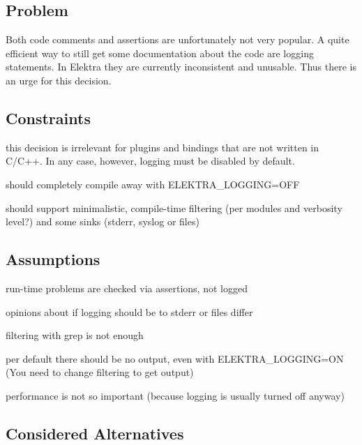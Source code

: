 \subsection*{Problem}

Both code comments and assertions are unfortunately not very popular. A quite efficient way to still get some documentation about the code are logging statements. In Elektra they are currently inconsistent and unusable. Thus there is an urge for this decision.

\subsection*{Constraints}


\begin{DoxyItemize}
\item this decision is irrelevant for plugins and bindings that are not written in C/\+C++. In any case, however, logging must be disabled by default.
\item should completely compile away with E\+L\+E\+K\+T\+R\+A\+\_\+\+L\+O\+G\+G\+I\+NG=O\+FF
\item should support minimalistic, compile-\/time filtering (per modules and verbosity level?) and some sinks (stderr, syslog or files)
\end{DoxyItemize}

\subsection*{Assumptions}


\begin{DoxyItemize}
\item run-\/time problems are checked via assertions, not logged
\item opinions about if logging should be to stderr or files differ
\item filtering with grep is not enough
\item per default there should be no output, even with E\+L\+E\+K\+T\+R\+A\+\_\+\+L\+O\+G\+G\+I\+NG=ON (You need to change filtering to get output)
\item performance is not so important (because logging is usually turned off anyway)
\end{DoxyItemize}

\subsection*{Considered Alternatives}


